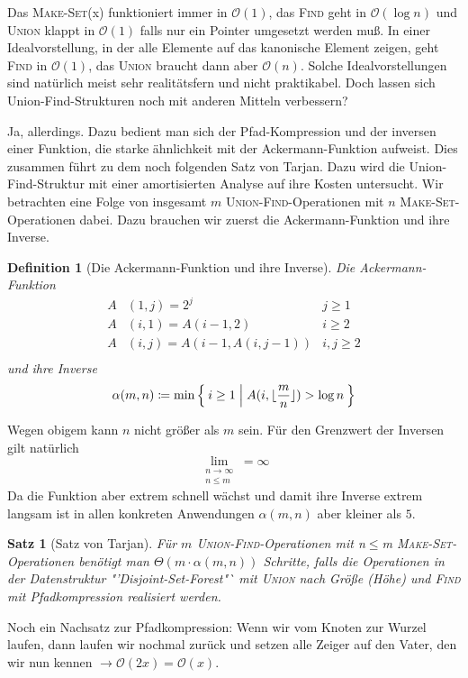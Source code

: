 \documentclass[ngerman,draft,parskip=half*,twoside]{scrreprt}
\theoremstyle{break}
\newtheorem{satz}{Satz}[chapter]
\newtheorem{definition}{Definition}[chapter]
\theoremstyle{nonumberbreak}
\newcommand*{\OO}{\mathcal{O}}      %
\DeclarePairedDelimiter{\floor}{\lfloor}{\rfloor}
\begin{document}
Das \textsc{Make-Set}(x) funktioniert immer in $\OO(1)$, das \textsc{Find} geht in $\OO(\log n)$ und \textsc{Union} klappt in
$\OO(1)$ falls nur ein Pointer umgesetzt werden muß. In einer Idealvorstellung, in der alle Elemente auf das kanonische
Element zeigen, geht \textsc{Find} in $\OO(1)$, das \textsc{Union} braucht dann aber $\OO(n)$. Solche Idealvorstellungen sind
natürlich meist sehr realitätsfern und nicht praktikabel. Doch lassen sich Union-Find-Strukturen noch mit anderen
Mitteln verbessern?

Ja, allerdings. Dazu bedient man sich der Pfad-Kompression und der inversen einer Funktion, die starke ähnlichkeit mit
der Ackermann-Funktion aufweist. Dies zusammen führt zu dem noch folgenden Satz von Tarjan. Dazu wird die
Union-Find-Struktur mit einer amortisierten Analyse auf ihre Kosten untersucht. Wir betrachten eine Folge von insgesamt 
$m$ \textsc{Union-Find}-Operationen mit $n$ \textsc{Make-Set}-Operationen dabei. Dazu brauchen wir zuerst die
Ackermann-Funktion und ihre Inverse.
\begin{definition}[Die Ackermann-Funktion und ihre Inverse]
 Die Ackermann-Funktion
 \begin{align*}
 A&(1,j)=2^j   & j\geq 1\\
 A&(i,1)=A(i-1,2)   & i\geq 2\\
 A&(i,j)=A(i-1, A(i,j-1))   & i,j \geq 2\\
 \end{align*}
 und ihre Inverse
 \begin{gather*}
   \alpha(m,n)\coloneqq \min\Set{i \geq 1 | A(i,\floor{\frac{m}{n}})> \log n}
 \end{gather*}
\end{definition}
Wegen obigem kann $n$ nicht größer als $m$ sein. Für den Grenzwert der Inversen gilt natürlich
\[\lim_{\substack{n \rightarrow \infty \\n \leq m }}=\infty\]
Da die Funktion aber extrem schnell wächst und damit ihre Inverse extrem langsam ist in allen konkreten Anwendungen 
$\alpha (m,n)$ aber kleiner als $5$. 

\begin{satz}[Satz von Tarjan]
Für $m$ \textsc{Union-Find}-Operationen mit n$\leq$m \textsc{Make-Set}-Operationen benötigt man $\Theta( m \cdot
\alpha(m,n))$ Schritte, falls die Operationen in der Datenstruktur "'Disjoint-Set-Forest"` mit \textsc{Union} nach
Größe (Höhe) und \textsc{Find} mit Pfadkompression realisiert werden.
\end{satz}
Noch ein Nachsatz zur Pfadkompression: Wenn wir vom Knoten zur Wurzel laufen, dann laufen wir nochmal zurück und setzen
alle Zeiger auf den Vater, den wir nun kennen $\rightarrow \OO(2x)=\OO(x)$.
\end{document}
